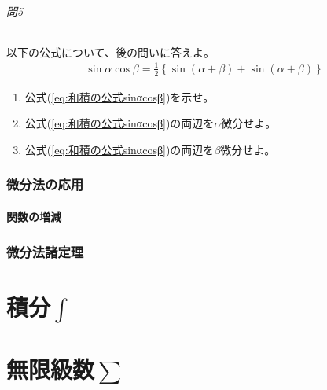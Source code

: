 \documentclass[a4j,dvipdfmx]{jsarticle}
\begin{document}
                \paragraph{問5}以下の公式について、後の問いに答えよ。
                \begin{eqnarray}
                    \sin\alpha\cos\beta=\frac{1}{2}\left\{\sin(\alpha+\beta)+\sin(\alpha+\beta)\right\}\label{eq:和積の公式sinαcosβ}
                \end{eqnarray}
                \begin{enumerate}\renewcommand{\labelenumi}{(\arabic{enumii})}\setcounter{enumii}{1}
                    \item 公式(\ref{eq:和積の公式sinαcosβ})を示せ。
                    \item 公式(\ref{eq:和積の公式sinαcosβ})の両辺を$\alpha$微分せよ。
                    \item 公式(\ref{eq:和積の公式sinαcosβ})の両辺を$\beta$微分せよ。
                \end{enumerate}
                
            \clearpage
            \section{微分法の応用}
                \subsection{関数の増減}
            \clearpage
            \section{微分法諸定理}


            
            

                
    \clearpage

    \part{積分$\int$}

    \clearpage
    \part{無限級数$\sum$}
\end{document}
